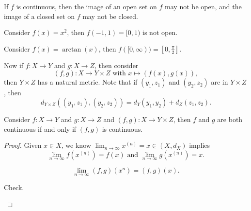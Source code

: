 \begin{remark}
    If \(f\) is continuous, then the image of an open set on \(f\) may not be open, and the image of a closed set on \(f\) may not be closed.     
\end{remark}

\begin{eg}
    Consider \(f(x) = x^2\), then \(f(-1, 1) = [0, 1)\) is not open.   
\end{eg}

\begin{eg}
    Consider \(f(x) = \arctan (x)\), then \(f([0, \infty )) = [0, \frac{\pi}{2}]\).  
\end{eg}

Now if \(f: X \to Y\) and \(g: X \to Z\), then consider
\[
    (f, g) : X \to Y \times Z \text{ with } x \mapsto (f(x), g(x)),
\] then \(Y \times Z\) has a natural metric. Note that if \((y_1, z_1) \) and \((y_2, z_2)\) are in \(Y \times Z\), then 
\[
    d_{Y \times Z}\left( (y_1, z_1), (y_2, z_2) \right) = d_Y(y_1, y_2) + d_Z(z_1, z_2). 
\]    

\begin{lemma}
    Consider \(f: X \to Y\) and \(g: X \to Z\) and \((f, g): X \to Y \times Z\), then \(f\) and \(g\) are both continuous if and only if \((f, g)\) is continuous.       
\end{lemma}
\begin{proof}
    Given \(x \in X\), we know \(\lim_{n \to \infty} x^{(n)} = x \in (X, d_X) \) implies 
    \[
        \lim_{n \to \infty} f \left( x^{(n)} \right) = f(x) \text{ and } \lim_{n \to \infty} g \left( x^{(n)} \right) = x.    
    \] 
    \begin{claim}
        \[
            \lim_{n \to \infty} (f, g)(x^n) = (f, g)(x). 
        \]
    \end{claim}
    \begin{explanation}
        Check.
    \end{explanation}
\end{proof}
